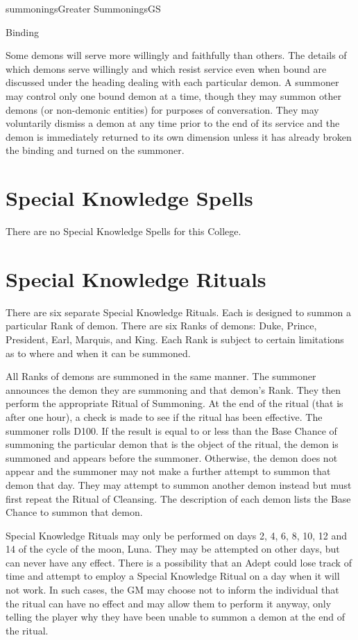 \begin{College}[1.0]{summonings}{Greater Summonings}{GS}
\begin{ritual}[Q-6]{Binding}
\begin{effects}
Some demons will serve more willingly and faithfully than others.  The
details of which demons serve willingly and which resist service even
when bound are discussed under the heading dealing with each
particular demon.  A summoner may control only one bound demon at a
time, though they may summon other demons (or non-demonic entities)
for purposes of conversation.  They may voluntarily dismiss a demon at
any time prior to the end of its service and the demon is immediately
returned to its own dimension unless it has already broken the binding
and turned on the summoner.

\end{effects}
\end{ritual}

\section{Special Knowledge Spells}

There are no Special Knowledge Spells for this College.


\section{Special Knowledge Rituals}

There are six separate Special Knowledge Rituals.  Each is designed to
summon a particular Rank of demon.  There are six Ranks of demons:
Duke, Prince, President, Earl, Marquis, and King.  Each Rank is
subject to certain limitations as to where and when it can be
summoned.

All Ranks of demons are summoned in the same manner. The summoner
announces the demon they are summoning and that demon’s Rank. They
then perform the appropriate Ritual of Summoning.  At the end of the
ritual (that is after one hour), a check is made to see if the ritual
has been effective. The summoner rolls D100.  If the result is equal
to or less than the Base Chance of summoning the particular demon that
is the object of the ritual, the demon is summoned and appears before
the summoner. Otherwise, the demon does not appear and the summoner
may not make a further attempt to summon that demon that day. They may
attempt to summon another demon instead but must first repeat the
Ritual of Cleansing.  The description of each demon lists the Base
Chance to summon that demon.

Special Knowledge Rituals may only be performed on days 2, 4, 6, 8,
10, 12 and 14 of the cycle of the moon, Luna. They may be attempted on
other days, but can never have any effect. There is a possibility that
an Adept could lose track of time and attempt to employ a Special
Knowledge Ritual on a day when it will not work.  In such cases, the
GM may choose not to inform the individual that the ritual can have no
effect and may allow them to perform it anyway, only telling the
player why they have been unable to summon a demon at the end of the
ritual.


\end{College}
